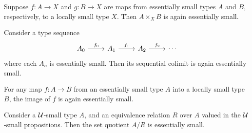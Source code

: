 \begin{cor}
Suppose $f:A\to X$ and $g:B\to X$ are maps from essentially small types $A$ and $B$, respectively, to a locally small type $X$. Then $A\times_X B$ is again essentially small. 
\end{cor}

\begin{lem}
Consider a type sequence
\begin{equation*}
\begin{tikzcd}
A_0 \arrow[r,"f_0"] & A_1 \arrow[r,"f_1"] & A_2 \arrow[r,"f_2"] & \cdots
\end{tikzcd}
\end{equation*}
where each $A_n$ is essentially small. Then its sequential colimit is again essentially small. 
\end{lem}

\begin{thm}\label{thm:replacement}
  For any map $f:A\to B$ from an essentially small type $A$ into a locally small type $B$, the image of $f$ is again essentially small.
\end{thm}

\begin{cor}
  Consider a $\mathcal{U}$-small type $A$, and an equivalence relation $R$ over $A$ valued in the $\mathcal{U}$-small propositions. Then the set quotient $A/R$ is essentially small.
\end{cor}

